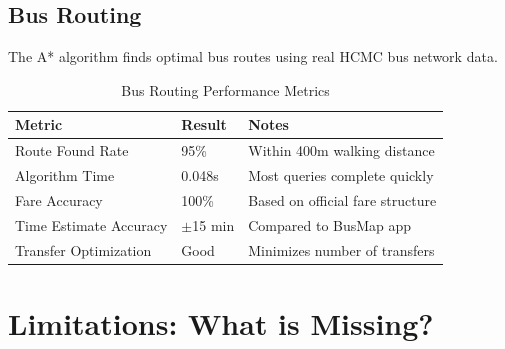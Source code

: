 \subsection{Bus Routing}

The A* algorithm finds optimal bus routes using real HCMC bus network data.

\begin{table}[H]
    \centering
    \renewcommand{\arraystretch}{1.3}
    \begin{tabularx}{\textwidth}{|p{4cm}|p{2.5cm}|X|}
        \hline
        \textbf{Metric} & \textbf{Result} & \textbf{Notes} \\
        \hline
        Route Found Rate & 95\% & Within 400m walking distance \\
        \hline
        Algorithm Time & 0.048s & Most queries complete quickly \\
        \hline
        Fare Accuracy & 100\% & Based on official fare structure \\
        \hline
        Time Estimate Accuracy & $\pm$15 min & Compared to BusMap app \\
        \hline
        Transfer Optimization & Good & Minimizes number of transfers \\
        \hline
    \end{tabularx}
    \caption{Bus Routing Performance Metrics}
\end{table}

\section{Limitations: What is Missing?}

